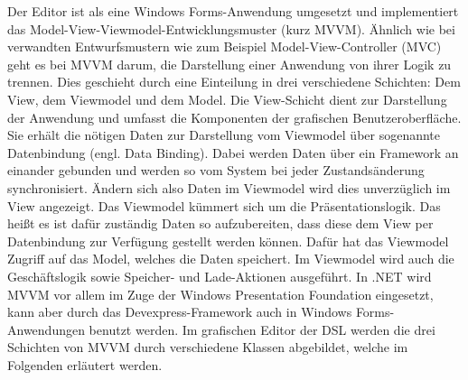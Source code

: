 Der Editor ist als eine Windows Forms-Anwendung umgesetzt und implementiert das Model-View-Viewmodel-Entwicklungsmuster (kurz MVVM). Ähnlich wie bei verwandten Entwurfsmustern wie zum Beispiel Model-View-Controller (MVC) geht es bei MVVM darum, die Darstellung einer Anwendung von ihrer Logik zu trennen. Dies geschieht durch eine Einteilung in drei verschiedene Schichten: Dem View, dem Viewmodel und dem Model. Die View-Schicht dient zur Darstellung der Anwendung und umfasst die Komponenten der grafischen Benutzeroberfläche. Sie erhält die nötigen Daten zur Darstellung vom Viewmodel über sogenannte Datenbindung (engl. Data Binding). Dabei werden Daten über ein Framework an einander gebunden und werden so vom System bei jeder Zustandsänderung synchronisiert. Ändern sich also Daten im Viewmodel wird dies unverzüglich im View angezeigt. Das Viewmodel kümmert sich um die Präsentationslogik. Das heißt es ist dafür zuständig Daten so aufzubereiten, dass diese dem View per Datenbindung zur Verfügung gestellt werden können. Dafür hat das Viewmodel Zugriff auf das Model, welches die Daten speichert. Im Viewmodel wird auch die Geschäftslogik sowie Speicher- und Lade-Aktionen ausgeführt. In .NET wird MVVM vor allem im Zuge der Windows Presentation Foundation eingesetzt, kann aber durch das Devexpress-Framework auch in Windows Forms-Anwendungen benutzt werden. 
\newline
Im grafischen Editor der DSL werden die drei Schichten von MVVM durch verschiedene Klassen abgebildet, welche im Folgenden erläutert werden.

